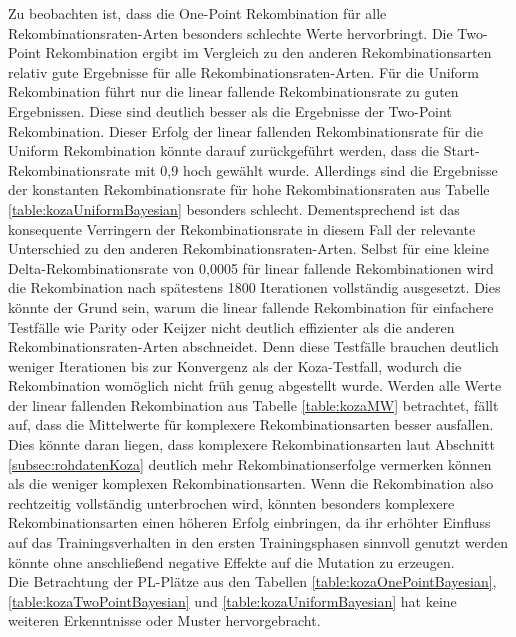 Zu beobachten ist, dass die One-Point Rekombination für alle Rekombinationsraten-Arten besonders schlechte Werte hervorbringt.
Die Two-Point Rekombination ergibt im Vergleich zu den anderen Rekombinationsarten relativ gute Ergebnisse für alle Re\-kom\-bi\-na\-tions\-raten-Arten.
Für die Uniform Rekombination führt nur die linear fallende Rekombinationsrate zu guten Ergebnissen.
Diese sind deutlich besser als die Ergebnisse der Two-Point Rekombination.
Dieser Erfolg der linear fallenden Rekombinationsrate für die Uniform Rekombination könnte darauf zurückgeführt werden, dass die Start-Rekombinationsrate mit 0,9 hoch gewählt wurde.
Allerdings sind die Ergebnisse der konstanten Rekombinationsrate für hohe Rekombinationsraten aus Tabelle \ref{table:kozaUniformBayesian} besonders schlecht.
Dementsprechend ist das konsequente Verringern der Rekombinationsrate in diesem Fall der relevante Unterschied zu den anderen Rekombinationsraten-Arten.
Selbst für eine kleine Delta-Rekombinationsrate von 0,0005 für linear fallende Rekombinationen wird die Rekombination nach spätestens 1800 Iterationen vollständig ausgesetzt.
Dies könnte der Grund sein, warum die linear fallende Rekombination für einfachere Testfälle wie Parity oder Keijzer nicht deutlich effizienter als die anderen Re\-kom\-bi\-na\-tions\-raten-Arten abschneidet.
Denn diese Testfälle brauchen deutlich weniger Iterationen bis zur Konvergenz als der Koza-Testfall, wodurch die Rekombination womöglich nicht früh genug abgestellt wurde.
Werden alle Werte der linear fallenden Rekombination aus Tabelle \ref{table:kozaMW} betrachtet, fällt auf, dass die Mittelwerte für komplexere Rekombinationsarten besser ausfallen.
Dies könnte daran liegen, dass komplexere Rekombinationsarten laut Abschnitt \ref{subsec:rohdatenKoza} deutlich mehr Rekombinationserfolge vermerken können als die weniger komplexen Rekombinationsarten.
Wenn die Rekombination also rechtzeitig vollständig unterbrochen wird, könnten besonders komplexere Rekombinationsarten einen höheren Erfolg einbringen, da ihr erhöhter Einfluss auf das Trainingsverhalten in den ersten Trainingsphasen sinnvoll genutzt werden könnte ohne anschließend negative Effekte auf die Mutation zu erzeugen.\\
Die Betrachtung der PL-Plätze aus den Tabellen \ref{table:kozaOnePointBayesian}, \ref{table:kozaTwoPointBayesian} und \ref{table:kozaUniformBayesian} hat keine weiteren Erkenntnisse oder Muster hervorgebracht.
